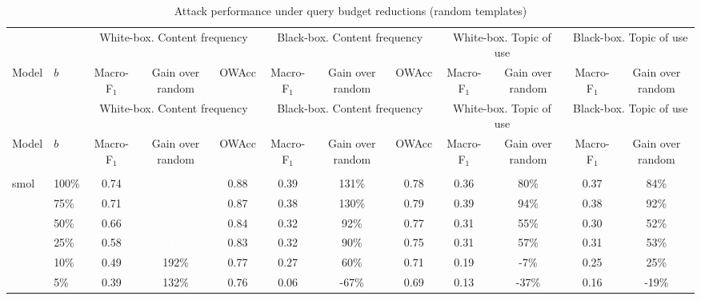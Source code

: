 \begingroup\footnotesize
\setlength{\tabcolsep}{3pt}
\begin{longtable}{llcccccccccc}
\caption{Attack performance under query budget reductions (random templates)}\\
\toprule
 & & \multicolumn{3}{c}{White-box. Content frequency} & \multicolumn{3}{c}{Black-box. Content frequency} & \multicolumn{2}{c}{White-box. Topic of use} & \multicolumn{2}{c}{Black-box. Topic of use} \\
Model & $b$ & Macro-F$_1$ & Gain over random & OWAcc & Macro-F$_1$ & Gain over random & OWAcc & Macro-F$_1$ & Gain over random & Macro-F$_1$ & Gain over random \\
\midrule
\endfirsthead
\toprule
 & & \multicolumn{3}{c}{White-box. Content frequency} & \multicolumn{3}{c}{Black-box. Content frequency} & \multicolumn{2}{c}{White-box. Topic of use} & \multicolumn{2}{c}{Black-box. Topic of use} \\
Model & $b$ & Macro-F$_1$ & Gain over random & OWAcc & Macro-F$_1$ & Gain over random & OWAcc & Macro-F$_1$ & Gain over random & Macro-F$_1$ & Gain over random \\
\midrule
\endhead
\bottomrule
\endlastfoot
\midrule
\multicolumn{12}{l}{\textbf{Random templates -- No cache -- PG19}} \\
\multirow{6}{*}{smol} & 100\% & 0.74 & \cellcolor{tablegreen!99}\textcolor{white}{345\%} & 0.88 & 0.39 & \cellcolor{tablegreen!37}131\% & 0.78 & 0.36 & \cellcolor{tablegreen!23}80\% & 0.37 & \cellcolor{tablegreen!24}84\% \\
 & 75\% & 0.71 & \cellcolor{tablegreen!93}\textcolor{white}{325\%} & 0.87 & 0.38 & \cellcolor{tablegreen!37}130\% & 0.79 & 0.39 & \cellcolor{tablegreen!27}94\% & 0.38 & \cellcolor{tablegreen!26}92\% \\
 & 50\% & 0.66 & \cellcolor{tablegreen!84}\textcolor{white}{295\%} & 0.84 & 0.32 & \cellcolor{tablegreen!26}92\% & 0.77 & 0.31 & \cellcolor{tablegreen!16}55\% & 0.30 & \cellcolor{tablegreen!15}52\% \\
 & 25\% & 0.58 & \cellcolor{tablegreen!71}\textcolor{white}{247\%} & 0.83 & 0.32 & \cellcolor{tablegreen!26}90\% & 0.75 & 0.31 & \cellcolor{tablegreen!16}57\% & 0.31 & \cellcolor{tablegreen!15}53\% \\
 & 10\% & 0.49 & \cellcolor{tablegreen!55}192\% & 0.77 & 0.27 & \cellcolor{tablegreen!17}60\% & 0.71 & 0.19 & \cellcolor[HTML]{E8A0A0}-7\% & 0.25 & \cellcolor{tablegreen!7}25\% \\
 & 5\% & 0.39 & \cellcolor{tablegreen!38}132\% & 0.76 & 0.06 & \cellcolor[HTML]{E8A0A0}-67\% & 0.69 & 0.13 & \cellcolor[HTML]{E8A0A0}-37\% & 0.16 & \cellcolor[HTML]{E8A0A0}-19\% \\

\end{longtable}
